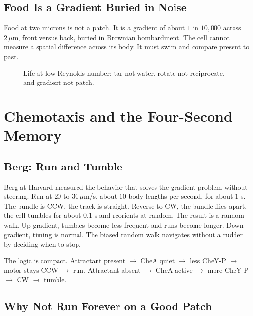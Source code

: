 \documentclass[11pt,a4paper]{article}
\begin{document}
\subsection{Food Is a Gradient Buried in Noise}

Food at two microns is not a patch. It is a gradient of about $1$ in $10{,}000$ across $2\,\mu$m, front versus back, buried in Brownian bombardment. The cell cannot measure a spatial difference across its body. It must swim and compare present to past.

\begin{figure}[h]
\centering
{}
\caption{Life at low Reynolds number: tar not water, rotate not reciprocate, and gradient not patch.}
\label{fig:lowre}
\end{figure}

\section{Chemotaxis and the Four-Second Memory}
\label{sec:chemotaxis}

\subsection{Berg: Run and Tumble}

Berg at Harvard measured the behavior that solves the gradient problem without steering. Run at $20$ to $30\,\mu$m/s, about $10$ body lengths per second, for about $1$ s. The bundle is CCW, the track is straight. Reverse to CW, the bundle flies apart, the cell tumbles for about $0.1$ s and reorients at random. The result is a random walk. Up gradient, tumbles become less frequent and runs become longer. Down gradient, timing is normal. The biased random walk navigates without a rudder by deciding when to stop.

The logic is compact. Attractant present $\to$ CheA quiet $\to$ less CheY-P $\to$ motor stays CCW $\to$ run. Attractant absent $\to$ CheA active $\to$ more CheY-P $\to$ CW $\to$ tumble.

\subsection{Why Not Run Forever on a Good Patch}
\end{document}
